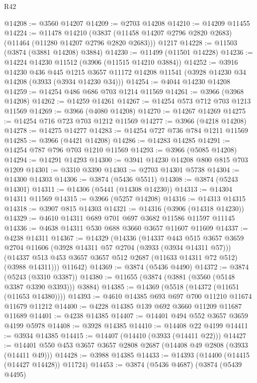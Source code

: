 \begin{lexlean}{R42}
\begin{coremodule}
@14208 := @3560 @14207
@14209 := @2703 @14208
@14210 := @14209 @11455
@14224 := @11478
    @14210
    (@3837 (@11458 @14207 @2796 @2820 @2683) (@11464 (@11280 @14207 @2796 @2820 @2683)))
    @1217
@14228 := @11503 (@3874 (@3881 @14208) @3884)
@14230 := @11499 (@11501 @14228)
@14236 := @14224 @14230 @11512 (@3906 (@11515 @14210 @3884))
@14252 := @3916
    @14230
    @436
    @445
    @1215
    @3657
    @11172
    @14208
    @11541
    (@3928 @14230 @34 @14208 (@3933 (@3934 @14230 @34)))
@14254 := @4044 @14230 @14208
@14259 := @14254 @486 @686 @703 @1214 @11569
@14261 := @3966 (@3968 @14208)
@14262 := @14259 @14261
@14267 := @14254 @573 @712 @703 @1213 @11569
@14269 := @3966 (@4080 @14208)
@14270 := @14267 @14269
@14275 := @14254 @716 @723 @703 @1212 @11569
@14277 := @3966 (@4218 @14208)
@14278 := @14275 @14277
@14283 := @14254 @727 @736 @784 @1211 @11569
@14285 := @3966 (@4421 @14208)
@14286 := @14283 @14285
@14291 := @14254 @787 @796 @703 @1210 @11569
@14293 := @3966 (@5085 @14208)
@14294 := @14291 @14293
@14300 := @3941 @14230 @14208 @800 @815 @703 @1209
@14301 := @3310 @3390
@14303 := @2703 @14301 @5738
@14304 := @14300 @14303
@14306 := @3874 (@5436 @5511)
@14308 := @3874 (@5243 @14301)
@14311 := @14306 (@5441 (@14308 @14230))
@14313 := @14304 @14311 @11569
@14315 := @3966 (@5257 @14208)
@14316 := @14313 @14315
@14318 := @3907 @815 @14303
@14321 := @14316 (@3906 (@14318 @14230))
@14329 := @4610 @14311 @689 @701 @697 @3682 @11586 @11597 @11145
@14336 := @4638 @14311 @530 @688 @3660 @3657 @11607 @11609
@14337 := @4238 @14311
@14367 := @14329
    (@14336
      (@14337
        @443
        @515
        @3657
        @3659
        @2704
        @11606
        (@3928 @14311 @57 @2704 (@3933 (@3934 @14311 @57)))
        (@14337 @513 @453 @3657 @3657 @512 @2687 (@11633 @14311 @72 @512) (@3988 @14311)))
      @11642)
@14369 := @3874 (@5436 @4490)
@14372 := @3874 (@5243 (@3310 @3387))
@14380 := @11655 (@3874 (@3881 (@3560 (@5148 @3387 @3390 @3393))) @3884)
@14385 := @14369 (@5518 (@14372 (@11651 (@11653 @14380))))
@14393 := @4610 @14385 @693 @697 @700 @11210 @11674 @11679 @11212
@14400 := @4228 @14385 @139 @692 @3660 @11209 @11687 @11689
@14401 := @4238 @14385
@14407 := @14401 @494 @552 @3657 @3659 @4199 @5978
@14408 := @3928 @14385
@14410 := @14408 @22 @4199
@14411 := @3934 @14385
@14415 := @14407 (@14410 (@3933 (@14411 @22)))
@14427 := @14401 @550 @453 @3657 @3657 @2808 @2687 (@14408 @49 @2808 (@3933 (@14411 @49)))
@14428 := @3988 @14385
@14433 := @14393 (@14400 (@14415 (@14427 @14428)) @11724)
@14453 := @3874
    (@5436 @4687)
    (@3874
      (@5439 @4495)

\end{coremodule}
\end{lexlean}
